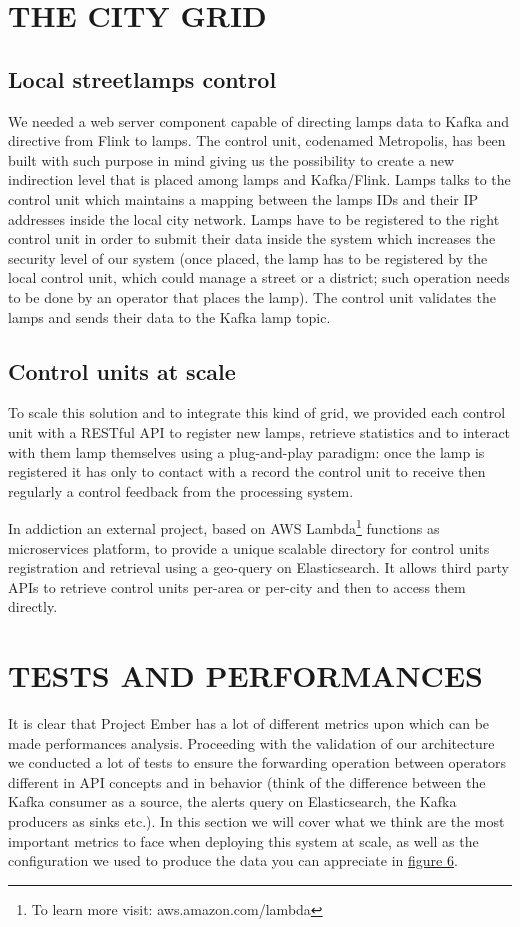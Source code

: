 \section{THE CITY GRID}

\subsection{Local streetlamps control}
We needed a web server component capable of directing lamps data to Kafka and directive from Flink to lamps. The control unit, codenamed Metropolis, has been built with such purpose in mind giving us the possibility to create a new indirection level that is placed among lamps and Kafka/Flink. Lamps talks to the control unit which maintains a mapping between the lamps IDs and their IP addresses inside the local city network. Lamps have to be registered to the right control unit in order to submit their data inside the system which increases the security level of our system (once placed, the lamp has to be registered by the local control unit, which could manage a street or a district; such operation needs to be done by an operator that places the lamp). The control unit validates the lamps and sends their data to the Kafka lamp topic. 
\subsection{Control units at scale}
To scale this solution and to integrate this kind of grid, we provided each control unit with a RESTful API to register new lamps, retrieve statistics and to interact with them lamp themselves using a plug-and-play paradigm: once the lamp is registered it has only to contact with a record the control unit to receive then regularly a control feedback from the processing system. 

In addiction an external project, based on AWS Lambda\footnote{To learn more visit: aws.amazon.com/lambda} functions as microservices platform, to provide a unique scalable directory for control units registration and retrieval using a geo-query on Elasticsearch. It allows third party APIs to retrieve control units per-area or per-city and then to access them directly. 
 
\section{TESTS AND PERFORMANCES}
It is clear that Project Ember has a lot of different metrics upon which can be made performances analysis. Proceeding with the validation of our architecture we conducted a lot of tests to ensure the forwarding operation between operators different in API concepts and in behavior (think of the difference between the Kafka consumer as a source, the alerts query on Elasticsearch, the Kafka producers as sinks etc.). In this section we will cover what we think are the most important metrics to face when deploying this system at scale, as well as the configuration we used to produce the data you can appreciate in \hyperref[fig:ember_metrics]{figure 6}.

